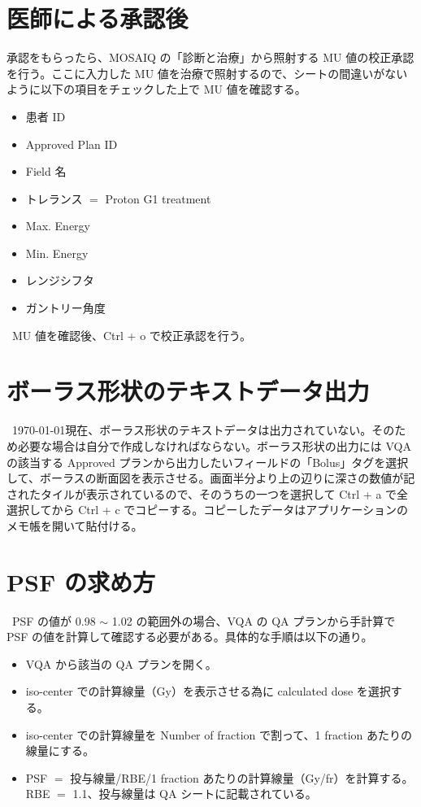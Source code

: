 \documentclass[11pt,a4paper]{jsarticle}
\newcommand{\noindot}{\noindent{$\cdot$}} %
\begin{document}
\section{医師による承認後}
\noindot 承認をもらったら、MOSAIQ の「診断と治療」から照射する MU 値の校正承認を行う。ここに入力した MU 値を治療で照射するので、シートの間違いがないように以下の項目をチェックした上で MU 値を確認する。
	\begin{itemize}
		\item 患者 ID
		\item Approved Plan ID
		\item Field 名
		\item トレランス $=$ Proton G1 treatment
		\item Max. Energy
		\item Min. Energy
		\item レンジシフタ
		\item ガントリー角度
	\end{itemize}%
\noindot ~MU 値を確認後、Ctrl + o で校正承認を行う。
%
\newpage
\appendix
\section{ボーラス形状のテキストデータ出力}
~\today 現在、ボーラス形状のテキストデータは出力されていない。そのため必要な場合は自分で作成しなければならない。ボーラス形状の出力には VQA の該当する Approved プランから出力したいフィールドの「Bolus」タグを選択して、ボーラスの断面図を表示させる。画面半分より上の辺りに深さの数値が記されたタイルが表示されているので、そのうちの一つを選択して Ctrl + a で全選択してから Ctrl + c でコピーする。コピーしたデータはアプリケーションのメモ帳を開いて貼付ける。
%
\section{PSF の求め方}
~PSF の値が 0.98 $\sim$ 1.02 の範囲外の場合、VQA の QA プランから手計算で PSF の値を計算して確認する必要がある。具体的な手順は以下の通り。
	\begin{itemize}
		\item VQA から該当の QA プランを開く。
		\item iso-center での計算線量（Gy）を表示させる為に calculated dose を選択する。
		\item iso-center での計算線量を Number of fraction で割って、1 fraction あたりの線量にする。
		\item PSF $=$ 投与線量/RBE/1 fraction あたりの計算線量（Gy/fr）を計算する。RBE $=$ 1.1、投与線量は QA シートに記載されている。
	\end{itemize}%
\end{document}
